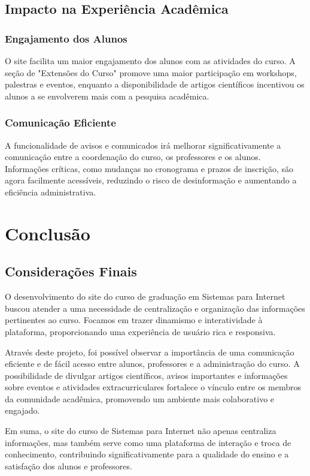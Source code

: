 \documentclass[a4paper,12pt]{report}
\begin{document}
\section{Impacto na Experiência Acadêmica}
\subsection{Engajamento dos Alunos}
O site facilita um maior engajamento dos alunos com as atividades do curso. A seção de "Extensões do Curso" promove uma maior participação em workshops, palestras e eventos, enquanto a disponibilidade de artigos científicos incentivou os alunos a se envolverem mais com a pesquisa acadêmica.
 
\subsection{Comunicação Eficiente}
A funcionalidade de avisos e comunicados irá melhorar significativamente a comunicação entre a coordenação do curso, os professores e os alunos. Informações críticas, como mudanças no cronograma e prazos de inscrição, são agora facilmente acessíveis, reduzindo o risco de desinformação e aumentando a eficiência administrativa.

\chapter{Conclusão} 

\section{Considerações Finais} 
O desenvolvimento do site do curso de graduação em Sistemas para Internet buscou atender a uma necessidade de centralização e organização das informações pertinentes ao curso. Focamos em trazer dinamismo e interatividade à plataforma, proporcionando uma experiência de usuário rica e responsiva. 

Através deste projeto, foi possível observar a importância de uma comunicação eficiente e de fácil acesso entre alunos, professores e a administração do curso. A possibilidade de divulgar artigos científicos, avisos importantes e informações sobre eventos e atividades extracurriculares fortalece o vínculo entre os membros da comunidade acadêmica, promovendo um ambiente mais colaborativo e engajado. 

Em suma, o site do curso de Sistemas para Internet não apenas centraliza informações, mas também serve como uma plataforma de interação e troca de conhecimento, contribuindo significativamente para a qualidade do ensino e a satisfação dos alunos e professores.
\end{document}
